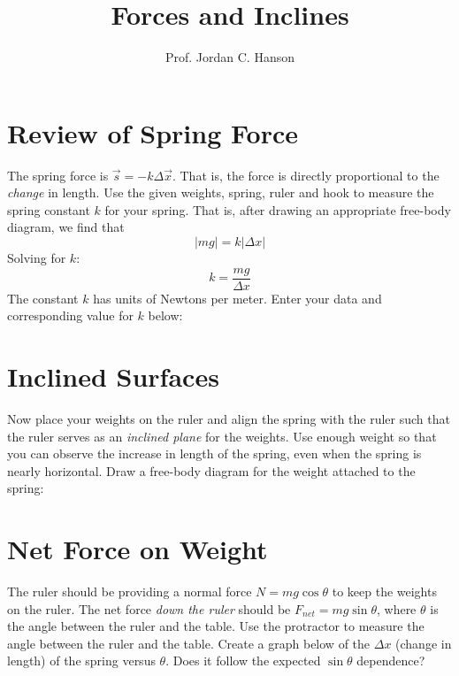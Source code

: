 \documentclass{article}
\begin{document}
\title{Forces and Inclines}
\author{Prof. Jordan C. Hanson}

\maketitle

\section{Review of Spring Force}
The spring force is $\vec{s} = -k\Delta \vec{x}$.  That is, the force is directly proportional to the \textit{change} in length.  Use the given weights, spring, ruler and hook to measure the spring constant $k$ for your spring.  That is, after drawing an appropriate free-body diagram, we find that 
\begin{equation}
|mg| = k|\Delta x|
\end{equation}
Solving for $k$:
\begin{equation}
k = \frac{mg}{\Delta x}
\end{equation}
The constant $k$ has units of Newtons per meter.  Enter your data and corresponding value for $k$ below: \\ \vspace{2cm}
\section{Inclined Surfaces}
Now place your weights on the ruler and align the spring with the ruler such that the ruler serves as an \textit{inclined plane} for the weights.  Use enough weight so that you can observe the increase in length of the spring, even when the spring is nearly horizontal.  Draw a free-body diagram for the weight attached to the spring: \\ \vspace{2cm}
\section{Net Force on Weight}
The ruler should be providing a normal force $N = mg \cos\theta$ to keep the weights on the ruler.  The net force \textit{down the ruler} should be $F_{net} = mg\sin\theta$, where $\theta$ is the angle between the ruler and the table.  Use the protractor to measure the angle between the ruler and the table.  Create a graph below of the $\Delta x$ (change in length) of the spring versus $\theta$.  Does it follow the expected $\sin\theta$ dependence?
\end{document}
